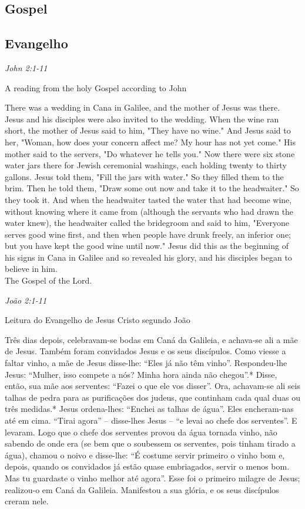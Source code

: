 \documentclass[10pt,a5]{article}
\newcommand \subsect[2] {\subsection*{#1} \switchcolumn \subsection*{#2} \switchcolumn*}
\begin{document}
\begin{paracol}{2}

 \subsect{Gospel}{Evangelho}

 \textit{John 2:1-11}

\hspace{2em} A reading from the holy Gospel according to John 

There was a wedding in Cana in Galilee, and the mother of Jesus was there.
Jesus and his disciples were also invited to the wedding.
When the wine ran short, the mother of Jesus said to him, "They have no wine."
And Jesus said to her, "Woman, how does your concern affect me? My hour has not yet come."
His mother said to the servers, "Do whatever he tells you."
Now there were six stone water jars there for Jewish ceremonial washings, each holding twenty to thirty gallons.
Jesus told them, "Fill the jars with water." So they filled them to the brim.
Then he told them, "Draw some out now and take it to the headwaiter." So they took it.
And when the headwaiter tasted the water that had become wine, without knowing where it came from (although the servants who had drawn the water knew), the headwaiter called the bridegroom
and said to him, "Everyone serves good wine first, and then when people have drunk freely, an inferior one; but you have kept the good wine until now."
Jesus did this as the beginning of his signs in Cana in Galilee and so revealed his glory, and his disciples began to believe in him.\\

{The Gospel of the Lord.}\\


 \switchcolumn


 \textit{João 2:1-11}

 \hspace{2em} Leitura do Evangelho de Jesus Cristo segundo Jo\~ao

Três dias depois, celebravam-se bodas em Caná da Galileia, e achava-se ali a mãe de Jesus.
Também foram convidados Jesus e os seus discípulos.
Como viesse a faltar vinho, a mãe de Jesus disse-lhe: “Eles já não têm vinho”.
Respondeu-lhe Jesus: “Mulher, isso compete a nós? Minha hora ainda não chegou”.*
Disse, então, sua mãe aos serventes: “Fazei o que ele vos disser”.
Ora, achavam-se ali seis talhas de pedra para as purificações dos judeus, que continham cada qual duas ou três medidas.*
Jesus ordena-lhes: “Enchei as talhas de água”. Eles encheram-nas até em cima.
“Tirai agora” – disse-lhes Jesus – “e levai ao chefe dos serventes”. E levaram.
Logo que o chefe dos serventes provou da água tornada vinho, não sabendo de onde era (se bem que o soubessem os serventes, pois tinham tirado a água), chamou o noivo
e disse-lhe: “É costume servir primeiro o vinho bom e, depois, quando os convidados já estão quase embriagados, servir o menos bom. Mas tu guardaste o vinho me­lhor até agora”.
Esse foi o primeiro milagre de Jesus; realizou-o em Caná da Galileia. Manifestou a sua glória, e os seus discípulos creram nele.\\


\end{paracol}
\end{document}
